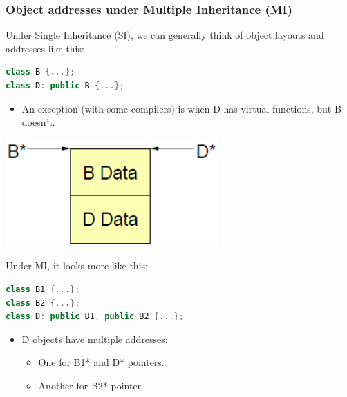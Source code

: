\subsubsection{Object addresses under Multiple Inheritance (MI)}
\begin{minipage}{0.75\linewidth}
Under Single Inheritance (SI), we can generally think of object layouts and addresses like this:
\begin{lstlisting}[language=C++]
class B {...};
class D: public B {...};
\end{lstlisting}
\begin{itemize}
  \item An exception (with some compilers) is when D has virtual functions, but B doesn't.
\end{itemize}
\end{minipage}%
\hfill
\begin{minipage}{0.2\linewidth}
\begin{center}
  \includegraphics[width=\linewidth]{images/AdvancedCPP/SI}
\end{center}
\end{minipage}%
\vspace{\baselineskip}
\begin{minipage}{0.75\linewidth}
Under MI, it looks more like this:
\begin{lstlisting}[language=C++]
class B1 {...};
class B2 {...};
class D: public B1, public B2 {...};
\end{lstlisting}
\begin{itemize}
  \item D objects have multiple addresses:
  \begin{itemize}
    \item One for B1* and D* pointers.
    \item Another for B2* pointer.
  \end{itemize}
\end{itemize}
\end{minipage}
